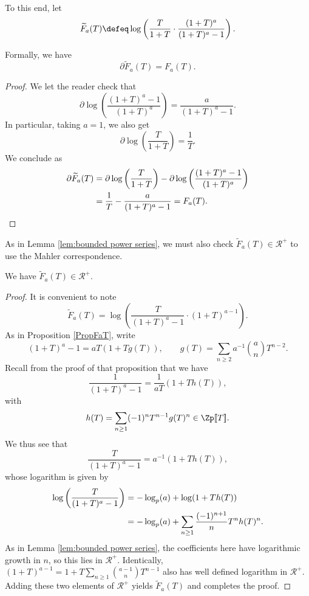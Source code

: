 \documentclass[a4paper,10pt, english, reqno]{smfart}
\newcommand{\lsem}{[\! [}
\newcommand{\rsem}{]\! ]}
\numberwithin{equation}{section}
\begin{document}
To this end, let
\[
\widetilde{F}_a(T) \defeq \log\left(\frac{T}{1+T} \cdot \frac{(1+T)^a}{(1+T)^a-1}\right).%
\]

\begin{lemma}
Formally, we have
\[
\partial \widetilde{F}_a(T) = F_a(T).
\]
\end{lemma}

\begin{proof}
We let the reader check that
\[ \partial \log\left(\frac{(1+T)^a-1}{(1+T)^a}\right) = \frac{a}{(1+T)^a-1}. \]
In particular, taking $a=1$, we also get 
\[
\partial\log\left(\frac{T}{1+T}\right) = \frac{1}{T}.
\]
We conclude as
\begin{align*}
\partial \widetilde{F}_a(T) &= \partial\log\left(\frac{T}{1+T}\right) - \partial\log\left(\frac{(1+T)^a-1}{(1+T)^a}\right)\\
&=\frac{1}{T} - \frac{a}{(1+T)^a-1} = F_a(T). \qedhere
\end{align*}
\end{proof}


As in Lemma \ref{lem:bounded power series}, we must also check $\widetilde{F}_a(T) \in \mathscr{R}^+$ to use the Mahler correspondence.

\begin{lemma}
We have $\widetilde{F}_a(T) \in \mathscr{R}^+$.
\end{lemma}

\begin{proof}
It is convenient to note
\begin{equation}\label{eq:tilde F_a 2}
\widetilde{F}_a(T) = \log\left(\frac{T}{(1+T)^a-1} \cdot (1+T)^{a-1}\right).
\end{equation}
As in Proposition \ref{PropFaT}, write
\[ (1+T)^a-1 = aT (1 + T g(T)),  \qquad g(T) = \sum_{n \geq 2} a^{-1} {a \choose n} T^{n - 2}.\]
Recall from the proof of that proposition that we have
\begin{equation}\label{eq:poly expansion}
\frac{1}{(1+T)^a - 1} = \frac{1}{aT}(1 + T h(T)), 
\end{equation}
with 
\[
h(T) = \sum_{n \geq 1} (-1)^n T^{n-1} g(T)^n \in \Zp\lsem T\rsem.
\]
We thus see that
\[
    \frac{T}{(1+T)^a-1} = a^{-1} (1 + T h(T)),
\]
whose logarithm is given by
\begin{align}
\log\left(\frac{T}{(1+T)^a-1}\right) &= -\log_p(a) + \log(1+Th(T))\notag\\ 
&= -\log_p(a) + \sum_{n\geq 1} \frac{(-1)^{n+1}}{n} T^n h(T)^n. \label{eq:F_a tilde}
\end{align}
As in Lemma \ref{lem:bounded power series}, the coefficients here have logarithmic growth in $n$, so this lies in $\mathscr{R}^+$. Identically, $(1 + T)^{a-1} = 1 + T \sum_{n \geq 1} {{a - 1} \choose n} T^{n-1}$ also has well defined logarithm in $\mathscr{R}^+$. Adding these two elements of $\mathscr{R}^+$ yields $\widetilde{F}_a(T)$ and completes the proof.
\end{proof}
\end{document}
